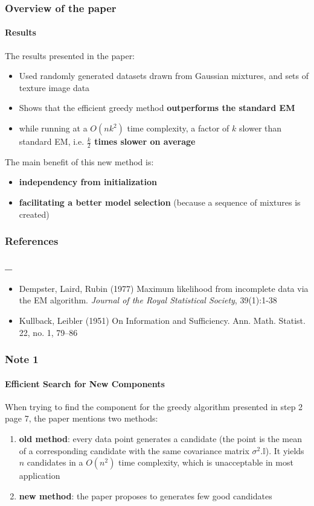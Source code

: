 \documentclass[aspectratio=43]{beamer}
\begin{document}
\begin{frame}
    \frametitle{Overview of the paper}
    \framesubtitle{Results}
    The results presented in the paper:
    \begin{itemize}
      \item Used randomly generated datasets drawn from Gaussian mixtures, and sets of texture image data
      \item Shows that the efficient greedy method \textbf{outperforms the standard EM}
      \item while running at a $O(nk^2)$ time complexity, a factor of $k$ slower than standard EM, i.e. \textbf{$\frac{k}{2}$ times slower on average}\newline
    \end{itemize}
    The main benefit of this new method is:
    \begin{itemize}
      \item \textbf{independency from initialization}
      \item \textbf{facilitating a better model selection} (because a sequence of mixtures is created)
    \end{itemize}
\end{frame}

\begin{frame}
    \frametitle{References}
    \framesubtitle{_}
    \begin{itemize}
      \item Dempster, Laird, Rubin (1977) Maximum likelihood from incomplete data via the EM algorithm. \textit{Journal of the Royal Statistical Society}, 39(1):1-38
      \item Kullback, Leibler (1951) On Information and Sufficiency. Ann. Math. Statist. 22, no. 1, 79--86
    \end{itemize}
\end{frame}

\begin{frame}
\frametitle{Note 1}
\framesubtitle{Efficient Search for New Components}
    When trying to find the component for the greedy algorithm presented in step 2 page 7, the paper mentions two methods:
    \begin{small}\begin{enumerate}
      \item \textbf{old method}: every data point generates a candidate (the point is the mean of a corresponding candidate with the same covariance matrix $\sigma^2.\mathbb{I}$). It yields $n$ candidates in a $O(n^2)$ time complexity, which is unacceptable in most application
      \item \textbf{new method}: the paper proposes to generates few good candidates
    \end{enumerate}\end{small}
\end{frame}
\end{document}
